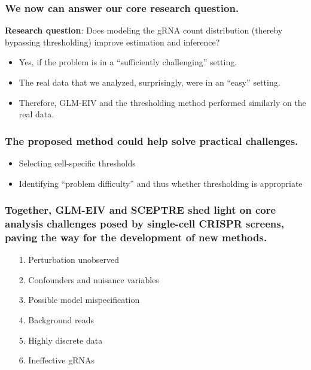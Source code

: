 \documentclass{beamer}
\begin{document}

\begin{frame}
\frametitle{We now can answer our core research question.}
\textbf{Research question}: Does modeling the gRNA count distribution (thereby bypassing thresholding) improve estimation and inference?
\begin{itemize}
\item Yes, if the problem is in a ``sufficiently challenging'' setting.
\item The real data that we analyzed, surprisingly, were in an ``easy'' setting.
\item Therefore, GLM-EIV and the thresholding method performed similarly on the real data.
\end{itemize}
\end{frame}


\begin{frame}
\frametitle{The proposed method could help solve practical challenges.}
\begin{itemize}
\item Selecting cell-specific thresholds
\item Identifying ``problem difficulty'' and thus whether thresholding is appropriate
\end{itemize}
\end{frame}

\begin{frame}
\frametitle{Together, GLM-EIV and SCEPTRE shed light on core analysis challenges posed by single-cell CRISPR screens, paving the way for the development of new methods.}
\begin{itemize}
	\item[1.] Perturbation unobserved
	\item[2.] Confounders and nuisance variables
	\item[3.] Possible model mispecification
	\item[4.] Background reads
	\item[5.] Highly discrete data
	\item[6.] Ineffective gRNAs
\end{itemize}
\end{frame}
\end{document}

